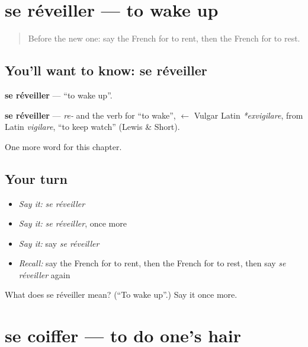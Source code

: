 \section[se réveiller]{se réveiller — to wake up}

\label{lesson:FR-C235-reveiller}



\begin{quote}
Before the new one: say the French for to rent, then the French for to rest.
\end{quote}

\subsection*{You'll want to know: se réveiller}
\textbf{se réveiller} — \textquotedblleft{}to wake up\textquotedblright{}.

\begin{cousinweb}
\textbf{se réveiller} — \emph{re-} and the verb for \textquotedblleft{}to wake\textquotedblright{}, $\leftarrow$ Vulgar Latin \emph{*exvigilare}, from Latin \emph{vigilare}, \textquotedblleft{}to keep watch\textquotedblright{} (Lewis \& Short).
\end{cousinweb}

\begin{grammarlens}[title={What you've built}]
One more word for this chapter.
\end{grammarlens}

\subsection*{Your turn}
\begin{itemize}
\raggedright
  \item \emph{Say it:} \emph{se réveiller}
  \item \emph{Say it:} \emph{se réveiller}, once more
  \item \emph{Say it:} say \emph{se réveiller}
  \item \emph{Recall:} say the French for to rent, then the French for to rest, then say \emph{se réveiller} again
\end{itemize}

\begin{tcolorbox}[breakable,colback=teal!4,colframe=teal!35!black,title={Before you move on}]
What does se réveiller mean? (\textquotedblleft{}To wake up\textquotedblright{}.) Say it once more.
\end{tcolorbox}
\section[se coiffer]{se coiffer — to do one's hair}

